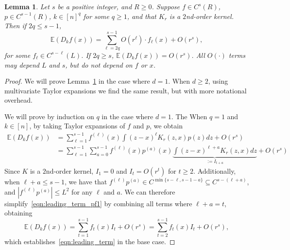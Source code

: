 \documentclass{article}
\newcommand{\abs}[1]{\left \lvert #1 \right \rvert}
\newcommand{\1}{\mathbf{1}}
\newcommand{\Ebb}{\mathbb{E}}
\theoremstyle{alden}
\theoremstyle{aldenthm}
\newtheorem{lemma}{Lemma}
\theoremstyle{definition}
\theoremstyle{remark}
\begin{document}
\begin{lemma}
	\label{lem:leading_term}
	Let $s$ be a positive integer, and $R \geq 0$. Suppose $f \in C^s(R)$, $p \in C^{s-1}(R)$, $k \in [n]^q$ for some $q \geq 1$, and that $K_r$ is a $2$nd-order kernel. Then if $2q \leq s - 1$,
	\begin{equation}
	\label{eqn:leading_term}
	\Ebb(D_kf(x)) = \sum_{\ell = 2q}^{s - 1} O(r^{\ell}) \cdot f_{\ell}(x) + O(r^s),
	\end{equation}
	for some $f_{\ell} \in C^{s - \ell}(L)$. If $2q \geq s$, $\Ebb(D_kf(x)) = O(r^s)$.  All $O(\cdot)$ terms may depend $L$ and $s$, but do not depend on $f$ or $x$.
\end{lemma}
\begin{proof}
	We will prove Lemma~\ref{lem:leading_term} in the case where $d = 1$. When $d \geq 2$, using multivariate Taylor expansions we find the same result, but with more notational overhead. 
	
	We will prove by induction on $q$ in the case where $d = 1$. The When $q = 1$ and $k \in [n]$, by taking Taylor expansions of $f$ and $p$, we obtain
	\begin{align}
	\nonumber 
	\Ebb(D_kf(x)) & = \sum_{\ell = 1}^{s - 1} f^{(\ell)}(x) \int (z - x)^{\ell} K_r(z,x) p(z) dz + O(r^s) \\ 
	& = \sum_{\ell = 1}^{s - 1} \sum_{a = 0}^{s - 1} f^{(\ell)}(x) p^{(a)}(x) \underbrace{\int(z - x)^{\ell + a} K_r(z,x) dz}_{:=I_{t + a}} + O(r^s) \label{eqn:leading_term_pf1}
	\end{align}
	Since $K$ is a $2$nd-order kernel, $I_{1} = 0$ and $I_t = O(r^{t})$ for $t \geq 2$.  Additionally, when $\ell + a \leq s - 1$, we have that $f^{(\ell)}p^{(a)} \in C^{\min\{s - \ell, s - 1 - a\}} \subseteq C^{s - (\ell + a)}$, and $\abs{f^{(\ell)}p^{(a)}} \leq L^2$ for any $\ell$ and $a$. We can therefore simplify~\eqref{eqn:leading_term_pf1} by combining all terms where $\ell + a = t$, obtaining
	\begin{equation}
	\label{eqn:leading_term_pf2}
	\Ebb(D_kf(x)) = \sum_{t = 1}^{s - 1} f_t(x) I_t + O(r^s) = \sum_{t = 2}^{s - 1} f_t(x) I_t + O(r^s),
	\end{equation}
	which establishes~\eqref{eqn:leading_term} in the base case.
	

\end{proof}
\end{document}
